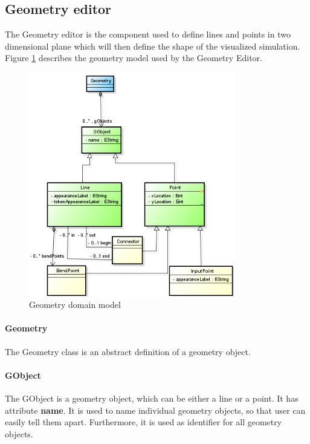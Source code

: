 \subsection{Geometry editor}

The Geometry editor is the component used to define lines and points in two dimensional plane which will then define the shape of the visualized simulation. Figure \ref{fig:model-geometry} describes the geometry model used by the Geometry Editor.

\begin{figure}[htp]
\begin{center}
  \includegraphics[width=0.8\textwidth]{image/geometry_diagram.png}
  \caption{Geometry domain model}
  \label{fig:model-geometry}
\end{center}
\end{figure}

\paragraph{Geometry}
The Geometry class is an abstract definition of a geometry object.

\paragraph{GObject}
The GObject is a geometry object, which can be either a line or a point. It has attribute \textbf{name}. It is used to name individual geometry objects, so that user can easily tell them apart. Furthermore, it is used as identifier for all geometry objects.

